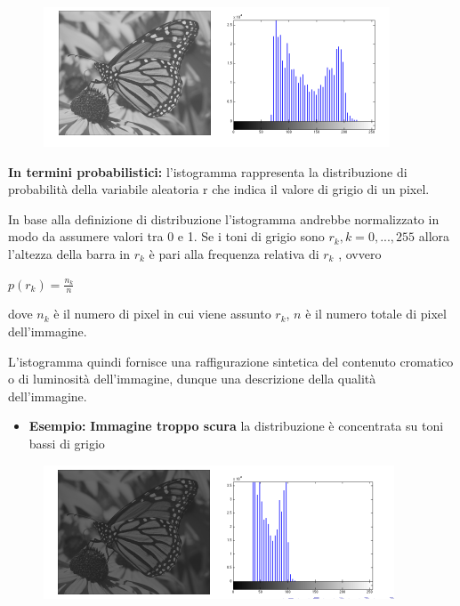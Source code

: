 \begin{figure}[H]
    \centering
    \includegraphics[width=\linewidth, keepaspectratio]{capitoli/immagini/imgs/esempio-istogramma.png}
\end{figure}

\textbf{In termini probabilistici:} l’istogramma rappresenta la distribuzione di probabilità della variabile aleatoria r che indica il
valore di grigio di un pixel.

\begin{definition}
    In base alla definizione di distribuzione l’istogramma andrebbe normalizzato in modo da assumere valori tra 0 e 1.
    Se i toni di grigio sono $r_k, k = 0, . . . , 255$ allora l’altezza della barra in $r_k$ è pari alla frequenza relativa di $r_k$ , ovvero
    \begin{center}
        $p(r_k) = \frac{n_k}{n}$
    \end{center}
    dove $n_k$ è il numero di pixel in cui viene assunto $r_k$, $n$ è il numero totale di pixel dell'immagine.
\end{definition}

L’istogramma quindi fornisce una raffigurazione sintetica del contenuto cromatico o di luminosità dell’immagine, dunque una descrizione
della qualità dell’immagine.

\begin{itemize}
    \item \textbf{Esempio:} \textbf{Immagine troppo scura}
          la distribuzione è concentrata su toni bassi di grigio
\end{itemize}

\begin{figure}[H]
    \centering
    \includegraphics[width=\linewidth, keepaspectratio]{capitoli/immagini/imgs/isto-scuro.png}
\end{figure}

